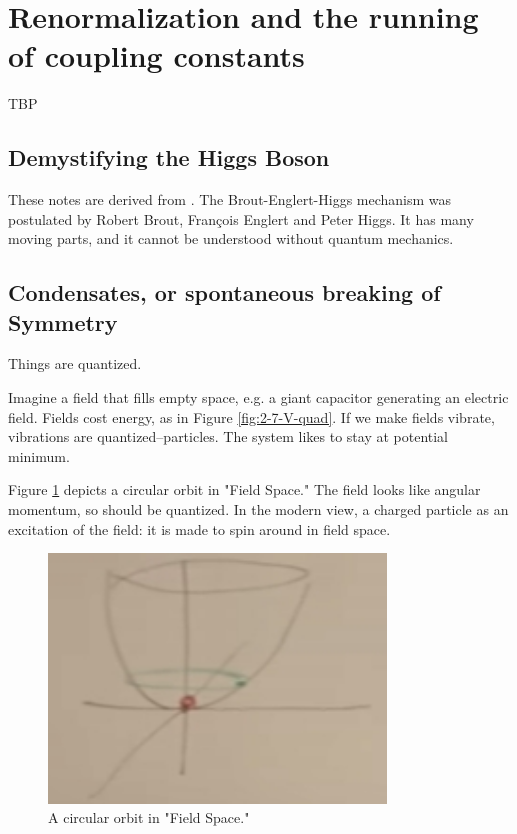 \documentclass[]{article}
\begin{document}
\section{Renormalization and the running of coupling constants}

TBP

\begin{appendices}
	\section{Demystifying the Higgs Boson}
	
	These notes are derived from \cite{susskind2010demystifing}.
	The  Brout-Englert-Higgs mechanism was postulated by Robert Brout, Fran\c{c}ois Englert and Peter Higgs. It has many moving parts, and it cannot be understood without quantum mechanics.
	
	\subsection{Condensates, or spontaneous breaking of Symmetry}
	
	Things are quantized.

	Imagine a field that fills empty space, e.g. a giant capacitor generating an electric field. Fields cost energy, as in Figure \ref{fig:2-7-V-quad}. If we make fields vibrate, vibrations are quantized--particles. The system likes to stay at potential minimum.
	
	Figure \ref{fig:2-appendix-field-circle} depicts a circular orbit in "Field Space." The field looks like angular momentum, so should be quantized. In the modern view,  a charged particle as an excitation of the field: it is made to spin around in field space.
	
	\begin{figure}[H]
		\caption{A circular orbit in "Field Space."}\label{fig:2-appendix-field-circle}
		\includegraphics[width=0.8\textwidth]{2-appendix-field-circle}
	\end{figure}
	

\end{appendices}
\end{document}
